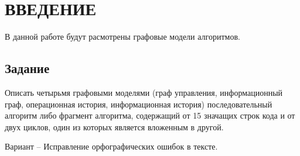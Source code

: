 \chapter*{\hfill{\centering ВВЕДЕНИЕ}\hfill}

В данной работе будут расмотрены графовые модели алгоритмов.

\section*{\hfill{\centering Задание}\hfill}

Описать четырьмя графовыми моделями (граф управления, информационный граф, операционная история, информационная история) последовательный алгоритм либо фрагмент алгоритма, содержащий от 15 значащих строк кода и от двух циклов, один из которых является вложенным в другой.

Вариант -- Исправление орфографических ошибок в тексте.